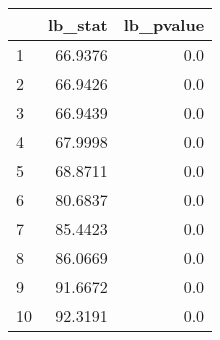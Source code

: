 \begin{tabular}{lrr}
\toprule
{} &  lb\_stat &  lb\_pvalue \\
\midrule
1  &  66.9376 &        0.0 \\
2  &  66.9426 &        0.0 \\
3  &  66.9439 &        0.0 \\
4  &  67.9998 &        0.0 \\
5  &  68.8711 &        0.0 \\
6  &  80.6837 &        0.0 \\
7  &  85.4423 &        0.0 \\
8  &  86.0669 &        0.0 \\
9  &  91.6672 &        0.0 \\
10 &  92.3191 &        0.0 \\
\bottomrule
\end{tabular}
